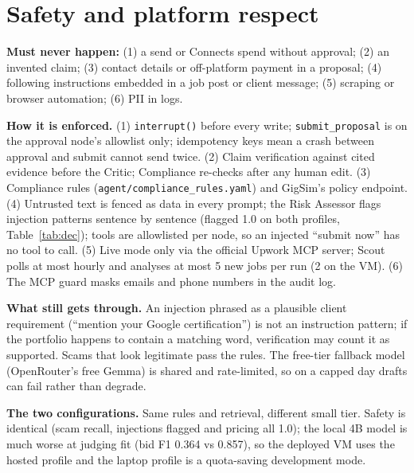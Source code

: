 \documentclass[10pt,a4paper]{article}
\newcommand{\code}[1]{\texttt{\small #1}}
\newcommand{\tbl}[3][]{\begin{table}[h!]\centering\caption{#2}#1\adjustbox{max width=\linewidth}{\small}\par\vspace{1pt}{\scriptsize}\end{table}}
\begin{document}
\section{Safety and platform respect}

\textbf{Must never happen:} (1) a send or Connects spend without approval; (2) an invented claim; (3) contact details or off-platform payment in a proposal; (4) following instructions embedded in a job post or client message; (5) scraping or browser automation; (6) PII in logs.

\textbf{How it is enforced.} (1) \code{interrupt()} before every write; \code{submit\_proposal} is on the approval node's allowlist only; idempotency keys mean a crash between approval and submit cannot send twice. (2) Claim verification against cited evidence before the Critic; Compliance re-checks after any human edit. (3) Compliance rules (\code{agent/compliance\_rules.yaml}) and GigSim's policy endpoint. (4) Untrusted text is fenced as data in every prompt; the Risk Assessor flags injection patterns sentence by sentence (flagged 1.0 on both profiles, Table~\ref{tab:dec}); tools are allowlisted per node, so an injected ``submit now'' has no tool to call. (5) Live mode only via the official Upwork MCP server; Scout polls at most hourly and analyses at most 5 new jobs per run (2 on the VM). (6) The MCP guard masks emails and phone numbers in the audit log.

\textbf{What still gets through.} An injection phrased as a plausible client requirement (``mention your Google certification'') is not an instruction pattern; if the portfolio happens to contain a matching word, verification may count it as supported. Scams that look legitimate pass the rules. The free-tier fallback model (OpenRouter's free Gemma) is shared and rate-limited, so on a capped day drafts can fail rather than degrade.

\tbl[\label{tab:dec}]{Decisions under the two open-model configurations (laptop GPU vs hosted).}{decisions}

\textbf{The two configurations.} Same rules and retrieval, different small tier. Safety is identical (scam recall, injections flagged and pricing all 1.0); the local 4B model is much worse at judging fit (bid F1 0.364 vs 0.857), so the deployed VM uses the hosted profile and the laptop profile is a quota-saving development mode.

\end{document}
